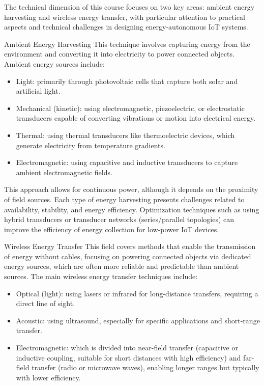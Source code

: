 The technical dimension of this course focuses on two key areas: ambient energy harvesting and wireless energy transfer, with particular attention to practical aspects and technical challenges in designing energy-autonomous IoT systems.

Ambient Energy Harvesting
This technique involves capturing energy from the environment and converting it into electricity to power connected objects. Ambient energy sources include:

\begin{itemize}
    \item Light: primarily through photovoltaic cells that capture both solar and artificial light.
    \item Mechanical (kinetic): using electromagnetic, piezoelectric, or electrostatic transducers capable of converting vibrations or motion into electrical energy.
    \item Thermal: using thermal transducers like thermoelectric devices, which generate electricity from temperature gradients.
    \item Electromagnetic: using capacitive and inductive transducers to capture ambient electromagnetic fields.
\end{itemize}


This approach allows for continuous power, although it depends on the proximity of field sources. Each type of energy harvesting presents challenges related to availability, stability, and energy efficiency. Optimization techniques such as using hybrid transducers or transducer networks (series/parallel topologies) can improve the efficiency of energy collection for low-power IoT devices.

Wireless Energy Transfer
This field covers methods that enable the transmission of energy without cables, focusing on powering connected objects via dedicated energy sources, which are often more reliable and predictable than ambient sources. The main wireless energy transfer techniques include:

\begin{itemize}
\item Optical (light): using lasers or infrared for long-distance transfers, requiring a direct line of sight.
\item Acoustic: using ultrasound, especially for specific applications and short-range transfer.
\item Electromagnetic: which is divided into near-field transfer (capacitive or inductive coupling, suitable for short distances with high efficiency) and far-field transfer (radio or microwave waves), enabling longer ranges but typically with lower efficiency.
\end{itemize}


